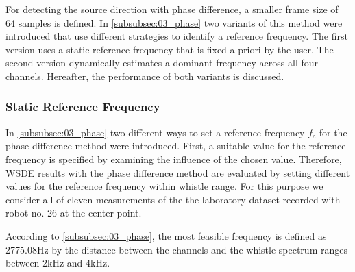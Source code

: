 For detecting the source direction with phase difference, a smaller frame
size of 64 samples is defined.
In \cref{subsubsec:03_phase} two variants of this method were introduced that use
different strategies to identify a reference frequency. The first version uses
a static reference frequency that is fixed a-priori by the user. The second version
dynamically estimates a dominant frequency across all four channels. Hereafter,
the performance of both variants is discussed.


\subsubsection*{Static Reference Frequency}

In \cref{subsubsec:03_phase} two different ways to set a reference frequency $f_c$
for the phase difference method were introduced.
First, a suitable value for the reference frequency is specified by
examining the influence of the chosen value.
Therefore, \ac{WSDE} results with the phase difference method are evaluated by setting
different values for the reference frequency within whistle range.
For this purpose we consider all of eleven measurements of the the laboratory-dataset
recorded with robot no. 26 at the center point.

According to \cref{subsubsec:03_phase}, the most feasible frequency is defined as
2775.08\si{\hertz} by the distance between the channels
and the whistle spectrum ranges between 2\si{\kilo\hertz}
and 4\si{\kilo\hertz}.

